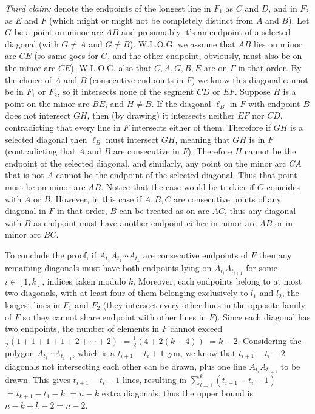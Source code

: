 \documentclass[11pt,a4paper]{article}
\begin{document}
\begin{itemize}
\emph{Third claim:} 
denote the endpoints of the longest line in $F_1$ as $C$ and $D$, and in $F_2$ as $E$ and $F$ (which might or might not be completely distinct from $A$ and $B$). 
Let $G$ be a point on minor arc $AB$ and presumably it's an endpoint of a selected diagonal (with $G\neq A$ and $G\neq B$). 
W.L.O.G. we assume that $AB$ lies on minor arc $CE$ (so same goes for $G$, and the other endpoint, obviously, must also be on the minor arc $CE$). W.L.O.G. also that $C, A, G, B, E$ are on $\Gamma$ in that order.
By the choice of $A$ and $B$ (consecutive endpoints in $F$) we know this diagonal cannot be in $F_1$ or $F_2$, so it intersects 
none of the segment $CD$ or $EF$. 
Suppose $H$ is a point on the minor arc $BE$, and $H\neq B$. If the diagonal $\ell_B$ in $F$ with endpoint $B$ does not intersect $GH$, 
then (by drawing) it intersects neither $EF$ nor $CD$, contradicting that every line in $F$ intersects either of them. 
Therefore if $GH$ is a selected diagonal then $\ell_B$ must intersect $GH$, meaning that $GH$ is in $F$ (contradicting that $A$ and $B$ are consecutive in $F$). 
Therefore $H$ cannot be the endpoint of the selected diagonal, and similarly, any point on the minor arc $CA$ that is not $A$ cannot be the endpoint of the selected diagonal. Thus that point must be on minor arc $AB$. 
Notice that the case would be trickier if $G$ coincides with $A$ or $B$. 
However, in this case if $A, B, C$ are consecutive points of any diagonal in $F$ in that order, $B$ can be treated as on arc $AC$, thus any diagonal with $B$ as endpoint must have another endpoint either in minor arc $AB$ or in minor arc $BC$. 

To conclude the proof, if $A_{t_1}A_{t_2}\cdots A_{t_k}$ are consecutive endpoints of $F$ then any remaining diagonals must have both endpoints lying on $A_{t_i}A_{t_{i+1}}$ for some $i\in [1,k]$, indices taken modulo $k$. 
Moreover, each endpoints belong to at most two diagonals, with at least four of them belonging exclusively to $l_1$ and $l_2$, the longest lines in $F_1$ and $F_2$ (they intersect every other lines in the opposite family of $F$ so they cannot share endpoint with other lines in $F$). 
Since each diagonal has two endpoints, the number of elements in $F$ cannot exceed $\frac 12(1+1+1+1+2+\cdots +2)$
$=\frac 12 (4+2(k-4))$
$=k-2$. 
Considering the polygon $A_{t_i}\cdots A_{t_{i+1}}$, which is a $t_{i+1}-t_{i}+1$-gon, 
we know that $t_{i+1}-t_{i}-2$ diagonals not intersecting each other can be drawn, plus one line $A_{t_i}A_{t_{i+1}}$ to be drawn. 
This gives $t_{i+1}-t_{i}-1$ lines, resulting in $\displaystyle\sum_{i=1}^k (t_{i+1}-t_i-1)$
$=t_{k+1}-t_1-k$
$=n-k$ 
extra diagonals, 
thus the upper bound is $n-k+k-2=n-2$. 


\end{itemize}
\end{document}
